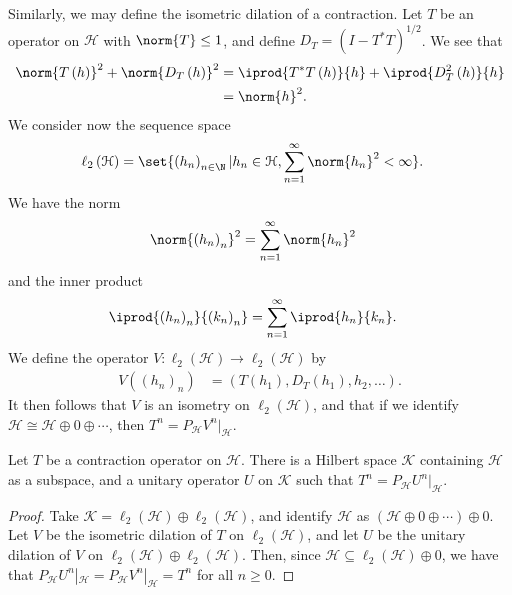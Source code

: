 \documentclass[10pt]{mypackage}
\begin{document}
\begin{example}
  Similarly, we may define the isometric dilation of a contraction. Let $T$ be an operator on $\mathcal{H}$ with $\norm{T}\leq 1$, and define $D_{T} = \left( I - T^{\ast}T \right)^{1/2}$. We see that
  \begin{align*}
    \norm{T\left( h \right)}^2 + \norm{D_T\left( h \right)}^2 &= \iprod{T^{\ast}T\left( h \right)}{h} + \iprod{D_T^2\left( h \right)}{h}\\
                                                              &= \norm{h}^2.
  \end{align*}
  We consider now the sequence space
  \begin{align*}
    \ell_2\left( \mathcal{H} \right) &= \set{\left( h_n \right)_{n\in\N} | h_n\in \mathcal{H},\sum_{n=1}^{\infty}\norm{h_n}^2 < \infty }.
  \end{align*}
  We have the norm
  \begin{align*}
    \norm{\left( h_n \right)_n}^2 &= \sum_{n=1}^{\infty}\norm{h_n}^2
  \end{align*}
  and the inner product
  \begin{align*}
    \iprod{\left( h_n \right)_n}{\left( k_n \right)_n} &= \sum_{n=1}^{\infty} \iprod{h_n}{k_n}.
  \end{align*}
  We define the operator $V\colon \ell_2\left( \mathcal{H} \right)\rightarrow \ell_2\left( \mathcal{H} \right)$ by
  \begin{align*}
    V\left( \left( h_n \right)_n \right) &= \left( T\left( h_1 \right),D_T\left( h_1 \right),h_2,\dots \right).
  \end{align*}
  It then follows that $V$ is an isometry on $\ell_2\left( \mathcal{H} \right)$, and that if we identify $\mathcal{H}\cong \mathcal{H}\oplus 0 \oplus \cdots$, then $T^n = P_{\mathcal{H}}V^n|_{\mathcal{H}}$.
\end{example}
\begin{theorem}
  Let $T$ be a contraction operator on $\mathcal{H}$. There is a Hilbert space $\mathcal{K}$ containing $\mathcal{H}$ as a subspace, and a unitary operator $U$ on $\mathcal{K}$ such that $T^n = P_{\mathcal{H}}U^{n}|_{\mathcal{H}}$.
\end{theorem}
\begin{proof}
  Take $\mathcal{K} = \ell_2\left( \mathcal{H} \right)\oplus \ell_2\left( \mathcal{H} \right)$, and identify $\mathcal{H}$ as $\left( \mathcal{H}\oplus 0 \oplus \cdots \right)\oplus 0$. Let $V$ be the isometric dilation of $T$ on $\ell_2\left( \mathcal{H} \right)$, and let $U$ be the unitary dilation of $V$ on $\ell_2\left( \mathcal{H} \right)\oplus \ell_2\left( \mathcal{H} \right)$. Then, since $\mathcal{H}\subseteq \ell_2\left( \mathcal{H} \right)\oplus 0$, we have that $P_{\mathcal{H}}U^{n}|_{\mathcal{H}} = P_{\mathcal{H}}V^{n}|_{\mathcal{H}} = T^n$ for all $n \geq 0$.
\end{proof}
\end{document}
